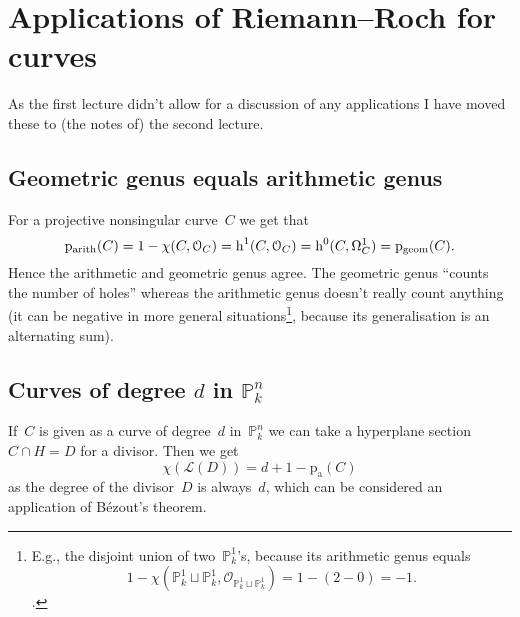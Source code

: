 \section{Applications of Riemann--Roch for curves}
\label{section:applications-curves}
As the first lecture didn't allow for a discussion of any applications I have moved these to (the notes of) the second lecture.

\subsection{Geometric genus equals arithmetic genus}
For a projective nonsingular curve~$C$ we get that
\begin{equation}
  \mathrm{p}_{\mathrm{arith}}(C)=1-\chi(C,\mathcal{O}_C)=\operatorname{h}^1(C,\mathcal{O}_C)=\operatorname{h}^0(C,\Omega_C^1)=\mathrm{p}_{\mathrm{geom}}(C).
\end{equation}
Hence the arithmetic and geometric genus agree. The geometric genus ``counts the number of holes'' whereas the arithmetic genus doesn't really count anything (it can be negative in more general situations\footnote{E.g., the disjoint union of two~$\mathbb{P}_k^1$'s, because its arithmetic genus equals\begin{equation}1-\chi(\mathbb{P}_k^1\sqcup\mathbb{P}_k^1,\mathcal{O}_{\mathbb{P}_k^1\sqcup\mathbb{P}_k^1})=1-(2-0)=-1.\end{equation}.}, because its generalisation is an alternating sum).

\subsection{Curves of degree \texorpdfstring{$d$}{d} in \texorpdfstring{$\mathbb{P}_k^n$}{n-dimensional projective space}}
If~$C$ is given as a curve of degree~$d$ in~$\mathbb{P}_k^n$ we can take a hyperplane section~$C\cap H=D$ for a divisor. Then we get
\begin{equation}
  \chi(\mathcal{L}(D))=d+1-\mathrm{p}_{\mathrm{a}}(C)
\end{equation}
as the degree of the divisor~$D$ is always~$d$, which can be considered an application of B\'ezout's theorem.

